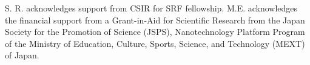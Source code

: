 \begin{acknowledgements}
S. R. acknowledges support from CSIR for SRF fellowship. M.E. acknowledges the financial support from a Grant-in-Aid for Scientific Research from the Japan Society for the Promotion of Science (JSPS), Nanotechnology Platform Program of the Ministry of Education, Culture, Sports, Science, and Technology (MEXT) of Japan.
\end{acknowledgements}


%

%
%


